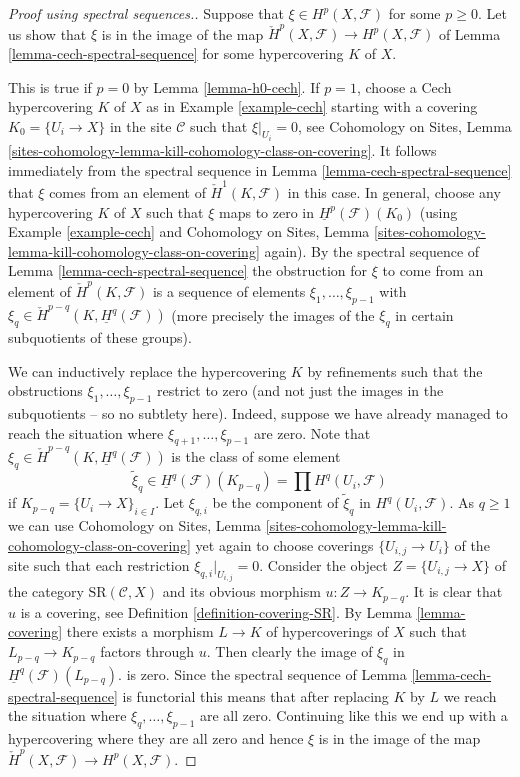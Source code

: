 \begin{proof}[Proof using spectral sequences.]
Suppose that $\xi \in H^p(X, \mathcal{F})$ for some $p \geq 0$.
Let us show that $\xi$ is in the image of the map
$\check{H}^p(X, \mathcal{F}) \to H^p(X, \mathcal{F})$ of
Lemma \ref{lemma-cech-spectral-sequence}
for some hypercovering $K$ of $X$.

\medskip\noindent
This is true if $p = 0$ by Lemma \ref{lemma-h0-cech}.
If $p = 1$, choose a Cech hypercovering $K$ of $X$ as in
Example \ref{example-cech} starting with a covering
$K_0 = \{U_i \to X\}$ in the site $\mathcal{C}$ such that
$\xi|_{U_i} = 0$, see
Cohomology on Sites,
Lemma \ref{sites-cohomology-lemma-kill-cohomology-class-on-covering}.
It follows immediately from the spectral sequence
in Lemma \ref{lemma-cech-spectral-sequence} that $\xi$ comes
from an element of $\check{H}^1(K, \mathcal{F})$ in this case.
In general, choose any hypercovering $K$ of $X$ such
that $\xi$ maps to zero in $\underline{H}^p(\mathcal{F})(K_0)$
(using Example \ref{example-cech} and
Cohomology on Sites,
Lemma \ref{sites-cohomology-lemma-kill-cohomology-class-on-covering}
again).
By the spectral sequence of Lemma \ref{lemma-cech-spectral-sequence}
the obstruction for $\xi$ to come from an element of
$\check{H}^p(K, \mathcal{F})$ is a sequence of elements
$\xi_1, \ldots, \xi_{p - 1}$ with
$\xi_q \in \check{H}^{p - q}(K, \underline{H}^q(\mathcal{F}))$
(more precisely the images of the $\xi_q$ in certain subquotients
of these groups).

\medskip\noindent
We can inductively replace the hypercovering $K$ by refinements
such that the obstructions $\xi_1, \ldots, \xi_{p - 1}$ restrict to zero
(and not just the images
in the subquotients -- so no subtlety here). Indeed, suppose we have
already managed to reach the situation where
$\xi_{q + 1}, \ldots, \xi_{p - 1}$ are zero.
Note that $\xi_q \in \check{H}^{p - q}(K, \underline{H}^q(\mathcal{F}))$
is the class of some element
$$
\tilde \xi_q \in
\underline{H}^q(\mathcal{F})(K_{p - q}) =
\prod H^q(U_i, \mathcal{F})
$$
if $K_{p - q} = \{U_i \to X\}_{i \in I}$. Let $\xi_{q, i}$
be the component of $\tilde \xi_q$ in $H^q(U_i, \mathcal{F})$.
As $q \geq 1$ we can use
Cohomology on Sites,
Lemma \ref{sites-cohomology-lemma-kill-cohomology-class-on-covering}
yet again to choose coverings $\{U_{i, j} \to U_i\}$
of the site such that each restriction $\xi_{q, i}|_{U_{i, j}} = 0$.
Consider the object $Z = \{U_{i, j} \to X\}$ of the category
$\text{SR}(\mathcal{C}, X)$ and its obvious morphism
$u : Z \to K_{p - q}$. It is clear that $u$ is a covering, see
Definition \ref{definition-covering-SR}. By
Lemma \ref{lemma-covering} there
exists a morphism $L \to K$ of hypercoverings of $X$ such that
$L_{p - q} \to K_{p - q}$ factors through $u$. Then clearly the
image of $\xi_q$ in $\underline{H}^q(\mathcal{F})(L_{p - q})$.
is zero. Since the spectral sequence of
Lemma \ref{lemma-cech-spectral-sequence}
is functorial this means that after replacing $K$ by $L$ we reach the
situation where $\xi_q, \ldots, \xi_{p - 1}$ are all zero.
Continuing like this we end up with a hypercovering where they are all
zero and hence $\xi$ is in the image of the map
$\check{H}^p(X, \mathcal{F}) \to H^p(X, \mathcal{F})$.


\end{proof}
